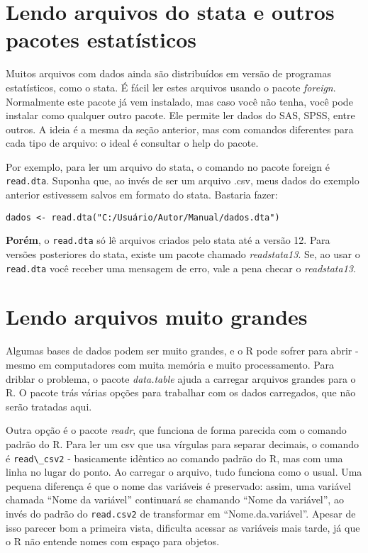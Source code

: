 \documentclass[
]{book}
\begin{document}
\hypertarget{lendo-arquivos-do-stata-e-outros-pacotes-estatuxedsticos}{%
\section{Lendo arquivos do stata e outros pacotes estatísticos}\label{lendo-arquivos-do-stata-e-outros-pacotes-estatuxedsticos}}

Muitos arquivos com dados ainda são distribuídos em versão de programas estatísticos, como o stata. É fácil ler estes arquivos usando o pacote \emph{foreign}. Normalmente este pacote já vem instalado, mas caso você não tenha, você pode instalar como qualquer outro pacote. Ele permite ler dados do SAS, SPSS, entre outros. A ideia é a mesma da seção anterior, mas com comandos diferentes para cada tipo de arquivo: o ideal é consultar o help do pacote.

Por exemplo, para ler um arquivo do stata, o comando no pacote foreign é \texttt{read.dta}. Suponha que, ao invés de ser um arquivo .csv, meus dados do exemplo anterior estivessem salvos em formato do stata. Bastaria fazer:

\begin{verbatim}
dados <- read.dta("C:/Usuário/Autor/Manual/dados.dta")
\end{verbatim}

\textbf{Porém}, o \texttt{read.dta} só lê arquivos criados pelo stata até a versão 12. Para versões posteriores do stata, existe um pacote chamado \emph{readstata13}. Se, ao usar o \texttt{read.dta} você receber uma mensagem de erro, vale a pena checar o \emph{readstata13}.

\hypertarget{lendo-arquivos-muito-grandes}{%
\section{Lendo arquivos muito grandes}\label{lendo-arquivos-muito-grandes}}

Algumas bases de dados podem ser muito grandes, e o R pode sofrer para abrir - mesmo em computadores com muita memória e muito processamento. Para driblar o problema, o pacote \emph{data.table} ajuda a carregar arquivos grandes para o R. O pacote trás várias opções para trabalhar com os dados carregados, que não serão tratadas aqui.

Outra opção é o pacote \emph{readr}, que funciona de forma parecida com o comando padrão do R. Para ler um csv que usa vírgulas para separar decimais, o comando é \texttt{read\textbackslash{}\_csv2} - basicamente idêntico ao comando padrão do R, mas com uma linha no lugar do ponto. Ao carregar o arquivo, tudo funciona como o usual. Uma pequena diferença é que o nome das variáveis é preservado: assim, uma variável chamada ``Nome da variável'' continuará se chamando ``Nome da variável'', ao invés do padrão do \texttt{read.csv2} de transformar em ``Nome.da.variável''. Apesar de isso parecer bom a primeira vista, dificulta acessar as variáveis mais tarde, já que o R não entende nomes com espaço para objetos.
\end{document}
